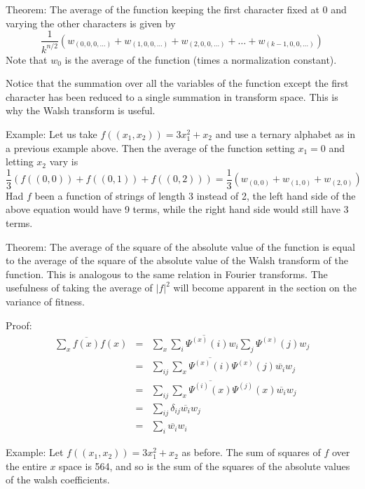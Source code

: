 Theorem:
The average of the function keeping the first character fixed at $0$ and
varying the other characters is given by
\begin{equation}
\frac{1}{k^{n/2}}
(w_{(0,0,0,\ldots)}+w_{(1,0,0,\ldots)}+w_{(2,0,0,\ldots)}+\ldots+
	w_{(k-1,0,0,\ldots)})
\end{equation}
Note that $w_0$ is the average of the function (times a normalization
constant).

Notice that the summation over all the variables of the function except
the first character has been reduced to a
single summation in transform space.  This is why the Walsh transform is
useful.

Example:
Let us take $f((x_1,x_2))=3 x_1^2+x_2$ and use a ternary alphabet as in 
a previous example above.  Then the average of the function setting $x_1=0$
and letting $x_2$ vary is
\begin{equation}
\frac{1}{3}(f((0,0))+f((0,1))+f((0,2)))=\frac{1}{3}(w_{(0,0)}+w_{(1,0)}+w_{(2,0)})
\end{equation}
Had $f$ been a function of strings of length 3 instead of 2, the left hand
side of the above equation would have 9 terms, while the right hand side
would still have 3 terms.

Theorem:
The average of the square of the absolute value of the function is
equal to the average of the square of the absolute value of the Walsh
transform of the function.  This is analogous to the same relation in
Fourier transforms.  The usefulness of taking the average of $|f|^2$ will
become apparent in the section on the variance of fitness.

Proof:
\begin{eqnarray}
\sum_x{\overline{f(x)} f(x)}&=& 
	\sum_x{\overline{\sum_i{\Psi^{(x)}(i) w_i}}
		\sum_j{\Psi^{(x)}(j) w_j}} \nonumber \\
	&=& \sum_{ij}\sum_x {\overline{\Psi^{(x)}(i)}
		\Psi^{(x)}(j)
		\overline{w_i} w_j } \nonumber \\
	&=& \sum_{ij}\sum_x {\overline{\Psi^{(i)}{(x)}}
		\Psi^{(j)}(x)
		\overline{w_i} w_j } \nonumber \\
	&=& \sum_{ij} \delta_{ij} \overline{w_i} w_j \nonumber\\
	&=& \sum_i \overline{w_i} w_i
\end{eqnarray}

Example:
Let $f((x_1,x_2))= 3x_1^2+x_2$ as before.  The sum of squares of $f$ over
the entire $x$ space is 564, and so is the sum of the squares of the
absolute values of the walsh coefficients.

